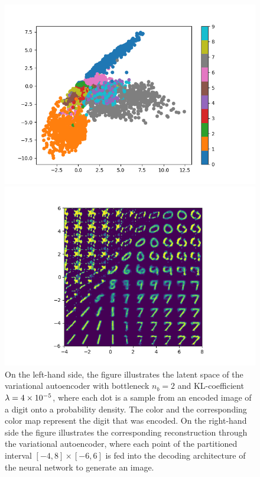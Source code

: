 \begin{figure}
\begin{center}
   \begin{minipage}[b]{0.49\linewidth}
      \includegraphics[trim = 10mm 5mm 15mm 10mm, clip, width=\linewidth]{convolutional_VAE_snd_KL_4e-5_10k_epochs_2D_latent}
	\end{minipage}
   \begin{minipage}[b]{0.49\linewidth}
      \includegraphics[trim = 15mm 5mm 15mm 10mm, clip, width=\linewidth]{convolutional_VAE_snd_KL_4e-5_10k_epochs_2D_reconstruction}
	\end{minipage}
\end{center}
\caption{On the left-hand side, the figure illustrates the latent space of the variational autoencoder with bottleneck $n_b=2$ and KL-coefficient $\lambda = \num{4e-5}$, where each dot is a sample from an encoded image of a digit onto a probability density. The color and the corresponding color map represent the digit that was encoded. On the right-hand side the figure illustrates the corresponding reconstruction through the variational autoencoder, where each point of the partitioned  interval $[-4, 8]\times [-6, 6]$ is fed into the decoding architecture of the neural network to generate an image.}\label{fig:convolutional_VAE_snd_KL_4e-5_10k_epochs_2D}
\end{figure}

